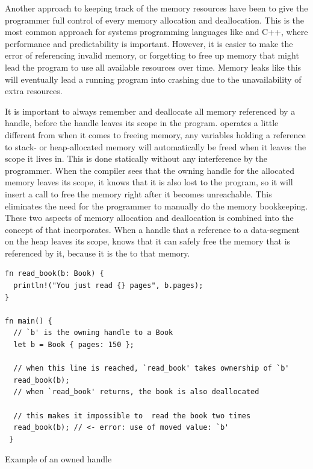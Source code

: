 Another approach to keeping track of the memory resources have been to give the programmer full control of every memory allocation and deallocation.
This is the most common approach for systems programming languages like {\C} and C++, where performance and predictability is important.
However, it is easier to make the error of referencing invalid memory, or forgetting to free up memory that might lead the program to use all available resources over time.
Memory leaks like this will eventually lead a running program into crashing due to the unavailability of extra resources.


It is important to always remember and deallocate all memory referenced by a handle, before the handle leaves its scope in the program.
\rust operates a little different from {\C} when it comes to freeing memory, any variables holding a reference to stack- or heap-allocated memory will automatically be freed when it leaves the scope it lives in.
This is done statically without any interference by the programmer.
When the compiler sees that the owning handle for the allocated memory leaves its scope, it knows that it is also lost to the program, so it will insert a call to free the memory right after it becomes unreachable.
This eliminates the need for the programmer to manually do the memory bookkeeping.
These two aspects of memory allocation and deallocation is combined into the concept of  that {\rust} incorporates.
When a handle that  a reference to a data-segment on the heap leaves its scope, {\rust} knows that it can safely free the memory that is referenced by it, because it is the  to that memory.

\begin{listing}[tb]
\begin{verbatim}
fn read_book(b: Book) {
  println!("You just read {} pages", b.pages);
}

fn main() {
  // `b' is the owning handle to a Book
  let b = Book { pages: 150 };

  // when this line is reached, `read_book' takes ownership of `b'
  read_book(b);
  // when `read_book' returns, the book is also deallocated

  // this makes it impossible to  read the book two times
  read_book(b); // <- error: use of moved value: `b'
 }
\end{verbatim}
\caption{Example of an owned handle}
\label{lst:owning_handle}
\end{listing}

